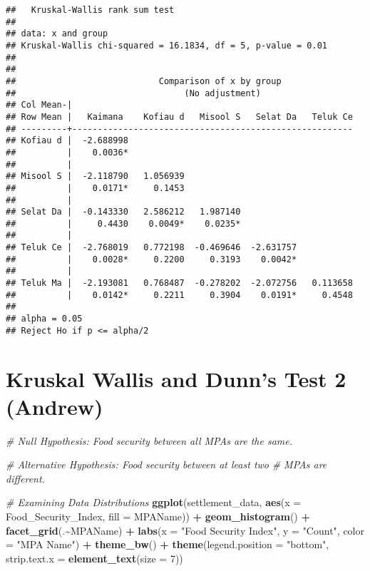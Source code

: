 \documentclass[
]{article}
\newenvironment{Shaded}{\begin{snugshade}}{\end{snugshade}}
\newcommand{\AttributeTok}[1]{\textcolor[rgb]{0.13,0.29,0.53}{#1}}
\newcommand{\CommentTok}[1]{\textcolor[rgb]{0.56,0.35,0.01}{\textit{#1}}}
\newcommand{\DecValTok}[1]{\textcolor[rgb]{0.00,0.00,0.81}{#1}}
\newcommand{\FunctionTok}[1]{\textcolor[rgb]{0.13,0.29,0.53}{\textbf{#1}}}
\newcommand{\NormalTok}[1]{#1}
\newcommand{\SpecialCharTok}[1]{\textcolor[rgb]{0.81,0.36,0.00}{\textbf{#1}}}
\newcommand{\StringTok}[1]{\textcolor[rgb]{0.31,0.60,0.02}{#1}}
\begin{document}
\begin{verbatim}
##   Kruskal-Wallis rank sum test
## 
## data: x and group
## Kruskal-Wallis chi-squared = 16.1834, df = 5, p-value = 0.01
## 
## 
##                            Comparison of x by group                            
##                                 (No adjustment)                                
## Col Mean-|
## Row Mean |   Kaimana    Kofiau d   Misool S   Selat Da   Teluk Ce
## ---------+-------------------------------------------------------
## Kofiau d |  -2.688998
##          |    0.0036*
##          |
## Misool S |  -2.118790   1.056939
##          |    0.0171*     0.1453
##          |
## Selat Da |  -0.143330   2.586212   1.987140
##          |     0.4430    0.0049*    0.0235*
##          |
## Teluk Ce |  -2.768019   0.772198  -0.469646  -2.631757
##          |    0.0028*     0.2200     0.3193    0.0042*
##          |
## Teluk Ma |  -2.193081   0.768487  -0.278202  -2.072756   0.113658
##          |    0.0142*     0.2211     0.3904    0.0191*     0.4548
## 
## alpha = 0.05
## Reject Ho if p <= alpha/2
\end{verbatim}

\section{Kruskal Wallis and Dunn's Test 2
(Andrew)}\label{kruskal-wallis-and-dunns-test-2-andrew}

\begin{Shaded}
\begin{Highlighting}[]
\CommentTok{\# Null Hypothesis: Food security between all MPAs are the same.}

\CommentTok{\# Alternative Hypothesis: Food security between at least two }
\CommentTok{\# MPAs are different. }

\CommentTok{\# Examining Data Distributions}
\FunctionTok{ggplot}\NormalTok{(settlement\_data, }\FunctionTok{aes}\NormalTok{(}\AttributeTok{x =}\NormalTok{ Food\_Security\_Index,}
                            \AttributeTok{fill =}\NormalTok{ MPAName)) }\SpecialCharTok{+}
  \FunctionTok{geom\_histogram}\NormalTok{() }\SpecialCharTok{+}
  \FunctionTok{facet\_grid}\NormalTok{(.}\SpecialCharTok{\textasciitilde{}}\NormalTok{MPAName) }\SpecialCharTok{+}
  \FunctionTok{labs}\NormalTok{(}\AttributeTok{x =} \StringTok{"Food Security Index"}\NormalTok{,}
       \AttributeTok{y =} \StringTok{"Count"}\NormalTok{,}
       \AttributeTok{color =} \StringTok{"MPA Name"}\NormalTok{) }\SpecialCharTok{+}
  \FunctionTok{theme\_bw}\NormalTok{() }\SpecialCharTok{+}
  \FunctionTok{theme}\NormalTok{(}\AttributeTok{legend.position =} \StringTok{"bottom"}\NormalTok{,}
        \AttributeTok{strip.text.x =} \FunctionTok{element\_text}\NormalTok{(}\AttributeTok{size =} \DecValTok{7}\NormalTok{))}
\end{Highlighting}
\end{Shaded}
\end{document}
